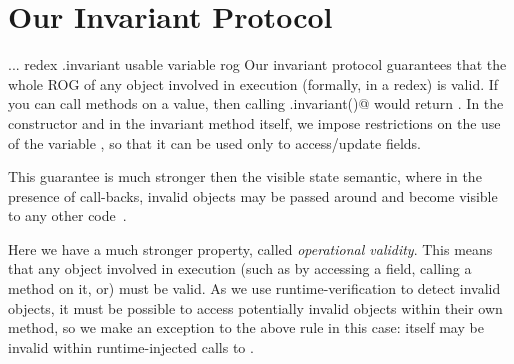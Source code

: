 







\section{Our Invariant Protocol}
... %
redex
.invariant
usable variable rog
Our invariant protocol guarantees that the whole ROG of any object involved in execution (formally, in a redex) is valid.
If you can call methods on a value, then calling \Q@.invariant()@ would return \Q@true@. 
In the constructor and in the invariant method itself, we impose restrictions
on the use of the variable \Q@this@, so that it can be used only to access/update fields.






 

This guarantee is much stronger then the visible state semantic, where in the presence of call-backs,
invalid objects may be passed around and become visible to any other code~\cite{??}.


 Here we have a much stronger property, called \emph{operational
 validity}. This means that any object involved in execution (such as by accessing a field, calling a method on it, or) must be valid. As we use runtime-verification to detect invalid objects, it must be possible to access potentially invalid objects within their own \Q@invariant@ method, so we make an exception to the above rule in this case: \Q@this@ itself may be invalid within runtime-injected calls to \Q@invariant@.









